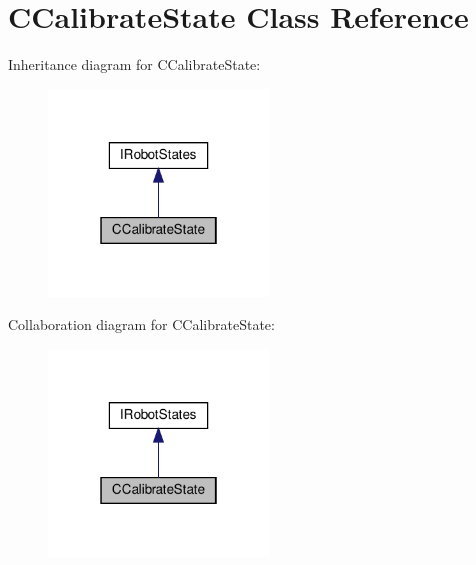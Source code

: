 \hypertarget{classCCalibrateState}{}\section{C\+Calibrate\+State Class Reference}
\label{classCCalibrateState}


Inheritance diagram for C\+Calibrate\+State\+:\nopagebreak
\begin{figure}[H]
\begin{center}
\leavevmode
\includegraphics[width=166pt]{classCCalibrateState__inherit__graph}
\end{center}
\end{figure}


Collaboration diagram for C\+Calibrate\+State\+:\nopagebreak
\begin{figure}[H]
\begin{center}
\leavevmode
\includegraphics[width=166pt]{classCCalibrateState__coll__graph}
\end{center}
\end{figure}
